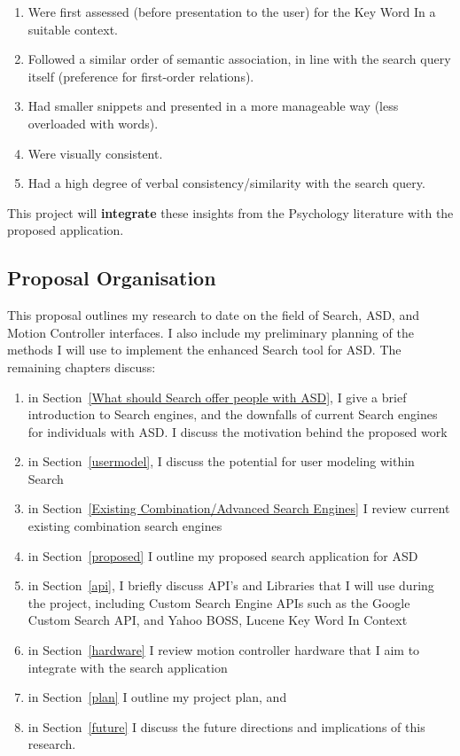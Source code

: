 \documentclass[10pt]{article}
\begin{document}
\begin{enumerate}
\item Were first assessed (before presentation to the user) for the Key Word In a suitable context.
\item Followed a similar order of semantic association, in line with the search query itself (preference for first-order relations). 
\item Had smaller snippets and presented in a more manageable way (less overloaded with words).
\item Were visually consistent.
\item Had a high degree of verbal consistency/similarity with the search query.
\end{enumerate}

This project will \textbf{integrate} these insights from the Psychology literature with the proposed application.

\subsection{Proposal Organisation}

This proposal outlines my research to date on the field of Search, ASD, and Motion Controller interfaces. I also include my preliminary planning of the methods I will use to implement the enhanced Search tool for ASD. The remaining chapters discuss:
\begin{enumerate}
\item in Section~\ref{What should Search offer people with ASD}, I give a brief introduction to Search engines, and the downfalls of current Search engines for individuals with ASD. I discuss the motivation behind the proposed work
\item in Section~\ref{usermodel}, I discuss the potential for user modeling within Search
\item in Section~\ref{Existing Combination/Advanced Search Engines} I review current existing combination search engines 
\item in Section~\ref{proposed} I outline my proposed search application for ASD
\item in Section~\ref{api}, I briefly discuss API's and Libraries that I will use during the project, including Custom Search Engine APIs such as the Google Custom Search API, and Yahoo BOSS, Lucene Key Word In Context
\item in Section~\ref{hardware} I review motion controller hardware that I aim to integrate with the search application
\item in Section~\ref{plan} I outline my project plan, and
\item in Section~\ref{future} I discuss the future directions and implications of this research.
\end{enumerate}
\end{document}
